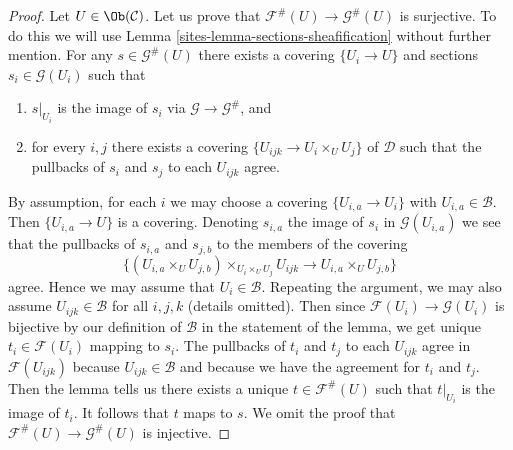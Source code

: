 \begin{proof}

Let $U \in \Ob(\mathcal{C})$.
Let us prove that $\mathcal{F}^\#(U) \to \mathcal{G}^\#(U)$ is
surjective. To do this we will use Lemma \ref{sites-lemma-sections-sheafification}
without further mention. For any $s \in \mathcal{G}^\#(U)$ there exists
a covering $\{U_i \to U\}$ and sections $s_i \in \mathcal{G}(U_i)$ such that
\begin{enumerate}
\item $s|_{U_i}$ is the image of $s_i$ via $\mathcal{G} \to \mathcal{G}^\#$,
and
\item for every $i, j$ there exists a covering
$\{U_{ijk} \to U_i \times_U U_j\}$ of $\mathcal{D}$ such that
the pullbacks of $s_i$ and $s_j$ to each $U_{ijk}$ agree.
\end{enumerate}
By assumption, for each $i$ we may choose a covering $\{U_{i, a} \to U_i\}$
with $U_{i, a} \in \mathcal{B}$. Then $\{U_{i, a} \to U\}$ is a covering.
Denoting $s_{i, a}$ the image of $s_i$ in $\mathcal{G}(U_{i, a})$
we see that the pullbacks of $s_{i, a}$ and $s_{j, b}$ to the members
of the covering
$$
\{(U_{i, a} \times_U U_{j, b}) \times_{U_i \times_U U_j} U_{ijk}
\to U_{i, a} \times_U U_{j, b}\}
$$
agree. Hence we may assume that $U_i \in \mathcal{B}$. Repeating
the argument, we may also assume $U_{ijk} \in \mathcal{B}$ for
all $i, j, k$ (details omitted).
Then since $\mathcal{F}(U_i) \to \mathcal{G}(U_i)$
is bijective by our definition of $\mathcal{B}$ in the statement
of the lemma, we get unique $t_i \in \mathcal{F}(U_i)$
mapping to $s_i$. The pullbacks of $t_i$ and $t_j$
to each $U_{ijk}$ agree in $\mathcal{F}(U_{ijk})$ because
$U_{ijk} \in \mathcal{B}$ and because we have the agreement
for $t_i$ and $t_j$.
Then the lemma tells us there exists a unique
$t \in \mathcal{F}^\#(U)$ such that $t|_{U_i}$ is the image of $t_i$.
It follows that $t$ maps to $s$.
We omit the proof that $\mathcal{F}^\#(U) \to \mathcal{G}^\#(U)$
is injective.
\end{proof}

